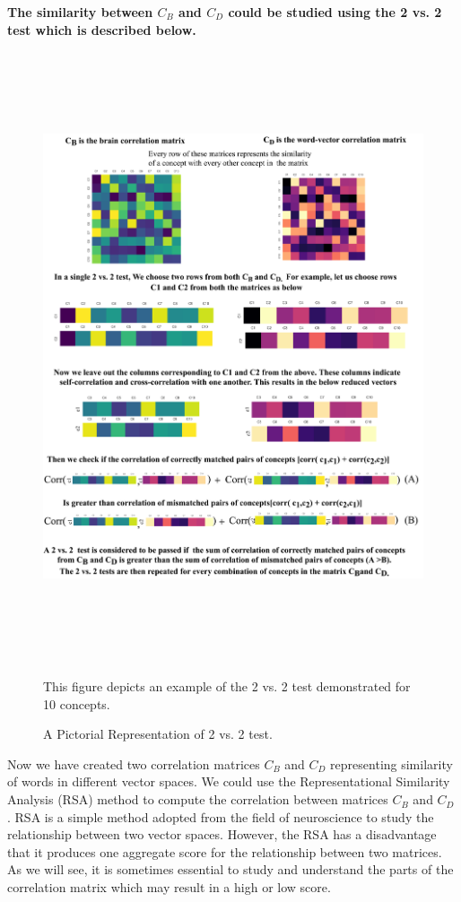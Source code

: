\newpage
\textbf{The similarity between $C_B$ and $C_D$ could be studied using the 2 vs. 2 test which is described below.}

\begin{figure}[!b]
\centering
\includegraphics[width=14cm, height=18cm]{Figures/2vs2brainbench}
\caption{A Pictorial Representation of 2 vs. 2 test.}
\label{2vs2bb}
This figure depicts an example of the 2 vs. 2 test demonstrated for 10 concepts.
\end{figure}
\newpage

Now we have created two correlation matrices $C_B$ and  $C_D$ representing similarity of words in different vector spaces. We could use the Representational Similarity Analysis (RSA) method to compute the correlation between matrices $C_B$ and  $C_D$ \cite{RSA}. RSA is a simple method adopted from the field of neuroscience to study the relationship between two vector spaces. However, the RSA has a disadvantage that it produces one aggregate score for the relationship between two matrices. As we will see, it is sometimes essential to study and understand the parts of the correlation matrix which may result in a high or low score. 


